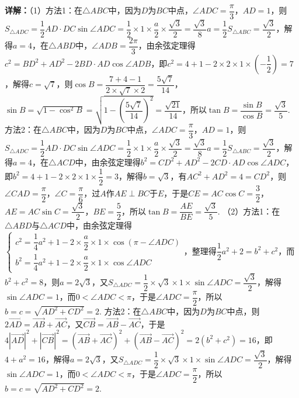 \begin{question}[points=10]
\begin{solution}
\textbf{详解：}（1）方法1：在$\triangle ABC$中，因为$D$为$BC$中点，$\angle ADC=\dfrac{\pi}{3}$，$AD=1$，则$S_{\triangle ADC}=\dfrac{1}{2}AD\cdot DC\sin\angle ADC=\dfrac{1}{2}\times1\times\dfrac{a}{2}\times\dfrac{\sqrt{3}}{2}=\dfrac{\sqrt{3}}{8}a=\dfrac{1}{2}S_{\triangle ABC}=\dfrac{\sqrt{3}}{2}$，解得$a=4$，在$\triangle ABD$中，$\angle ADB=\dfrac{2\pi}{3}$，由余弦定理得$c^{2}=BD^{2}+AD^{2}-2BD\cdot AD\cos\angle ADB$，即$c^{2}=4+1-2\times2\times1\times(-\dfrac{1}{2})=7$，解得$c=\sqrt{7}$，则$\cos B=\dfrac{7+4-1}{2\times\sqrt{7}\times2}=\dfrac{5\sqrt{7}}{14}$，$\sin B=\sqrt{1-\cos^{2}B}=\sqrt{1-\left(\dfrac{5\sqrt{7}}{14}\right)^{2}}=\dfrac{\sqrt{21}}{14}$，所以$\tan B=\dfrac{\sin B}{\cos B}=\dfrac{\sqrt{3}}{5}$.
方法2：在$\triangle ABC$中，因为$D$为$BC$中点，$\angle ADC=\dfrac{\pi}{3}$，$AD=1$，则$S_{\triangle ADC}=\dfrac{1}{2}AD\cdot DC\sin\angle ADC=\dfrac{1}{2}\times1\times\dfrac{a}{2}\times\dfrac{\sqrt{3}}{2}=\dfrac{\sqrt{3}}{8}a=\dfrac{1}{2}S_{\triangle ABC}=\dfrac{\sqrt{3}}{2}$，解得$a=4$，在$\triangle ACD$中，由余弦定理得$b^{2}=CD^{2}+AD^{2}-2CD\cdot AD\cos\angle ADC$，即$b^{2}=4+1-2\times2\times1\times\dfrac{1}{2}=3$，解得$b=\sqrt{3}$，有$AC^{2}+AD^{2}=4=CD^{2}$，则$\angle CAD=\dfrac{\pi}{2}$，$\angle C=\dfrac{\pi}{6}$，过$A$作$AE\perp BC$于$E$，于是$CE=AC\cos C=\dfrac{3}{2}$，$AE=AC\sin C=\dfrac{\sqrt{3}}{2}$，$BE=\dfrac{5}{2}$，所以$\tan B=\dfrac{AE}{BE}=\dfrac{\sqrt{3}}{5}$.
（2）方法1：在$\triangle ABD$与$\triangle ACD$中，由余弦定理得$\begin{cases}c^{2}=\dfrac{1}{4}a^{2}+1-2\times\dfrac{a}{2}\times1\times\cos(\pi-\angle ADC)\\ b^{2}=\dfrac{1}{4}a^{2}+1-2\times\dfrac{a}{2}\times1\times\cos\angle ADC\end{cases}$，整理得$\dfrac{1}{2}a^{2}+2=b^{2}+c^{2}$，而$b^{2}+c^{2}=8$，则$a=2\sqrt{3}$，又$S_{\triangle ADC}=\dfrac{1}{2}\times\sqrt{3}\times1\times\sin\angle ADC=\dfrac{\sqrt{3}}{2}$，解得$\sin\angle ADC=1$，而$0<\angle ADC<\pi$，于是$\angle ADC=\dfrac{\pi}{2}$，所以$b=c=\sqrt{AD^{2}+CD^{2}}=2$.
方法2：在$\triangle ABC$中，因为$D$为$BC$中点，则$2\overrightarrow{AD}=\overrightarrow{AB}+\overrightarrow{AC}$，又$\overrightarrow{CB}=\overrightarrow{AB}-\overrightarrow{AC}$，于是$4|\overrightarrow{AD}|^{2}+|\overrightarrow{CB}|^{2}=(\overrightarrow{AB}+\overrightarrow{AC})^{2}+(\overrightarrow{AB}-\overrightarrow{AC})^{2}=2(b^{2}+c^{2})=16$，即$4+a^{2}=16$，解得$a=2\sqrt{3}$，又$S_{\triangle ADC}=\dfrac{1}{2}\times\sqrt{3}\times1\times\sin\angle ADC=\dfrac{\sqrt{3}}{2}$，解得$\sin\angle ADC=1$，而$0<\angle ADC<\pi$，于是$\angle ADC=\dfrac{\pi}{2}$，所以$b=c=\sqrt{AD^{2}+CD^{2}}=2$.
\end{solution}
\end{question}

